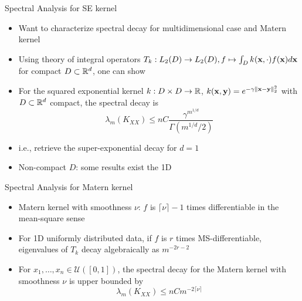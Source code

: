 \documentclass{beamer}
\begin{document}
\begin{frame}{Spectral Analysis for SE kernel}
\begin{itemize}
    \item Want to characterize spectral decay for multidimensional case and Matern kernel
    \item Using theory of integral operators $T_k: L_2(D) \to L_2(D), f \mapsto \int_D k(\boldsymbol{\mathbf{x}}, \cdot) f(\boldsymbol{\mathbf{x}}) d\boldsymbol{\mathbf{x}}$ for compact $D \subset \mathbb R^d$, one can show
    \item \begin{minipage}[t]{\linewidth}
        \vspace*{-1.2\baselineskip}
        \begin{theorem}
        For the squared exponential kernel $k: D \times D \to \mathbb R$, $k(\boldsymbol{\mathbf{x}}, \boldsymbol{\mathbf{y}}) = e^{-\gamma \Vert \boldsymbol{\mathbf{x}} - \boldsymbol{\mathbf{y}} \Vert_2^2}$ with $ D \subset \mathbb R^d$ compact, the spectral decay is
        \begin{equation*}
            \lambda_m(K_{XX}) \le n C \frac{ \gamma^{m^{1/d}} }{\Gamma(m^{1/d}/2)}
        \end{equation*}
        \end{theorem}
    \end{minipage}
    \item i.e., retrieve the super-exponential decay for $d=1$
    
    \item Non-compact $D$: some results exist the 1D
\end{itemize}
\end{frame}

\begin{frame}{Spectral Analysis for Matern kernel}
\begin{itemize}
    \item Matern kernel with smoothness $\nu$: $f$ is $\lceil \nu \rceil - 1$ times differentiable in the mean-square sense
    \item For 1D uniformly distributed data, if $f$ is $r$ times MS-differentiable, eigenvalues of $T_k$ decay algebraically as $m^{-2r - 2}$
    \item     \begin{minipage}[t]{\linewidth}
        \vspace*{-1.2\baselineskip}
        \begin{theorem}
        For $ x_1, \ldots,  x_n \in \mathcal U([0, 1])$, the spectral decay for the Matern kernel with smoothness $\nu$ is upper bounded by 
        \begin{equation*}
            \lambda_m(K_{XX}) \le n C m^{-2\lceil \nu \rceil }
        \end{equation*}
        \end{theorem}
    \end{minipage}
\end{itemize}
\end{frame}
\end{document}
